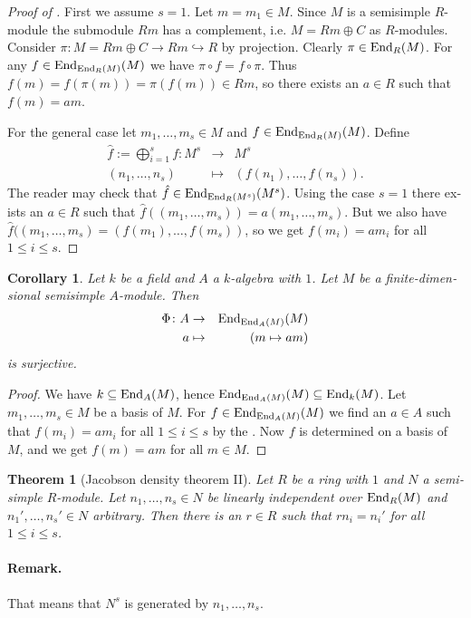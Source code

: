 \documentclass[12pt,a4paper]{scrartcl}
\theoremstyle{cplain}
\newtheorem{cor}[thmcounter]{Corollary}
\theoremstyle{cplain}
\newtheorem{thm}[thmcounter]{Theorem}
\theoremstyle{cplain}
\theoremstyle{definition}
\begin{document}
\begin{otherlanguage}{english}
\begin{proof}[Proof of ]
  First we assume $s=1$. Let $m=m_1\in M$. Since $M$ is a semisimple $R$-module the submodule $Rm$ has a complement, i.e. $M=Rm \oplus C$ as $R$-modules. Consider $\pi\colon M = Rm \oplus C \to Rm \hookrightarrow R$ by projection. Clearly $\pi\in\operatorname{End}_R(M)$. For any $f\in \operatorname{End}_{\operatorname{End}_{R}(M)}(M)$ we have $\pi\circ f = f\circ \pi$. Thus $f(m) = f(\pi(m)) = \pi(f(m)) \in Rm$, so there exists an $a\in R$ such that $f(m) = am$.
  
  For the general case let $m_1,\ldots,m_s\in M$ and $f\in \operatorname{End}_{\operatorname{End}_{R}(M)}(M)$. Define
  \begin{eqnarray*}
    \hat f := \bigoplus_{i=1}^sf\colon M^s &\to& M^s \\
    (n_1,\ldots,n_s) &\mapsto& (f(n_1),\ldots,f(n_s)).
  \end{eqnarray*}
  The reader may check that $\hat f \in \operatorname{End}_{\operatorname{End}_{R}(M^s)}(M^s)$. Using the case $s=1$ there exists an $a\in R$ such that $\hat f((m_1,\ldots,m_s)) = a(m_1,\ldots,m_s)$. But we also have $\hat f((m_1,\ldots,m_s) = (f(m_1),\ldots,f(m_s))$, so we get $f(m_i) = am_i$ for all $1\le i\le s$.
\end{proof}

\begin{cor} \label{cor:V.13} %
  Let $k$ be a field and $A$ a $k$-algebra with $1$. Let $M$ be a finite-dimensional semisimple $A$-module. Then
  \begin{eqnarray*}
    \Phi\colon A &\to& \operatorname{End}_{\operatorname{End}_{A}(M)}(M) \\
    a &\mapsto& (m \mapsto am)
  \end{eqnarray*}
  is surjective.
\end{cor}
\begin{proof}
  We have $k\subseteq \operatorname{End}_A(M)$, hence $\operatorname{End}_{\operatorname{End}_{A}(M)}(M) \subseteq \operatorname{End}_k(M)$. Let $m_1,\ldots,m_s\in M$ be a basis of $M$. For $f\in  \operatorname{End}_{\operatorname{End}_{A}(M)}(M)$ we find an $a\in A$ such that $f(m_i) = am_i$ for all $1\le i\le s$ by the . Now $f$ is determined on a basis of $M$, and we get $f(m) = am$ for all $m\in M$.
\end{proof}

\begin{thm}[Jacobson density theorem II] \label{thm:jacobson density II} %
  Let $R$ be a ring with $1$ and $N$ a semisimple $R$-module. Let $n_1,\ldots,n_s\in N$ be linearly independent over $\operatorname{End}_R(M)$ and $n_1',\ldots,n_s'\in N$ arbitrary. Then there is an $r\in R$ such that $rn_i = n_i'$ for all $1\le i\le s$.
\end{thm}

\paragraph{Remark.} That means that $N^s$ is generated by $n_1,\ldots,n_s$.


\end{otherlanguage}
\end{document}
